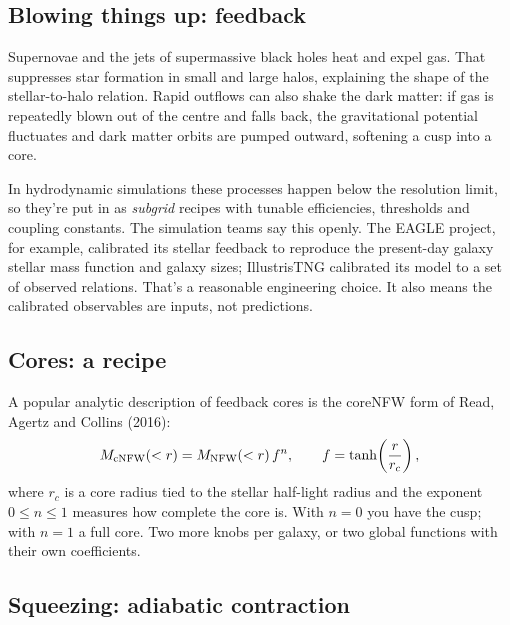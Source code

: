

\subsection{Blowing things up: feedback}

Supernovae and the jets of supermassive black holes heat and expel gas. That suppresses star formation in small and large halos, explaining the shape of the stellar-to-halo relation. Rapid outflows can also shake the dark matter: if gas is repeatedly blown out of the centre and falls back, the gravitational potential fluctuates and dark matter orbits are pumped outward, softening a cusp into a core.

In hydrodynamic simulations these processes happen below the resolution limit, so they're put in as \emph{subgrid} recipes with tunable efficiencies, thresholds and coupling constants. The simulation teams say this openly. The EAGLE project, for example, calibrated its stellar feedback to reproduce the present-day galaxy stellar mass function and galaxy sizes; IllustrisTNG calibrated its model to a set of observed relations. That's a reasonable engineering choice. It also means the calibrated observables are inputs, not predictions.

\subsection{Cores: a recipe}

A popular analytic description of feedback cores is the coreNFW form of Read, Agertz and Collins (2016):
\begin{equation}
M_{\rm cNFW}(<r)=M_{\rm NFW}(<r)\,f^n,\qquad f=\tanh\!\left(\frac{r}{r_c}\right),
\end{equation}
where $r_c$ is a core radius tied to the stellar half-light radius and the exponent $0\le n\le1$ measures how complete the core is. With $n=0$ you have the cusp; with $n=1$ a full core. Two more knobs per galaxy, or two global functions with their own coefficients.



\subsection{Squeezing: adiabatic contraction}

